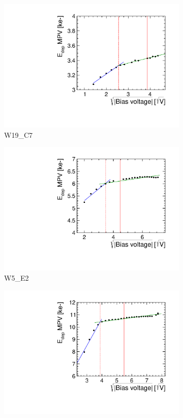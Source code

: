 \begin{figure}[htbp]
  \begin{subfigure}[b]{0.33\textwidth}
    \includegraphics[width=\textwidth]{./figures/TestBeam/depletionVoltage_W0019_C07_Edep.pdf}
    \caption{W19\_C7}
  \end{subfigure} \hfill
  \begin{subfigure}[b]{0.33\textwidth}
    \includegraphics[width=\textwidth]{./figures/TestBeam/depletionVoltage_W0005_E02_Edep.pdf}
    \caption{W5\_E2}
  \end{subfigure}\hfill
  \begin{subfigure}[b]{0.33\textwidth}
    \includegraphics[width=\textwidth]{./figures/TestBeam/depletionVoltage_W0005_F01_Edep.pdf}

\end{subfigure}
\end{figure}
